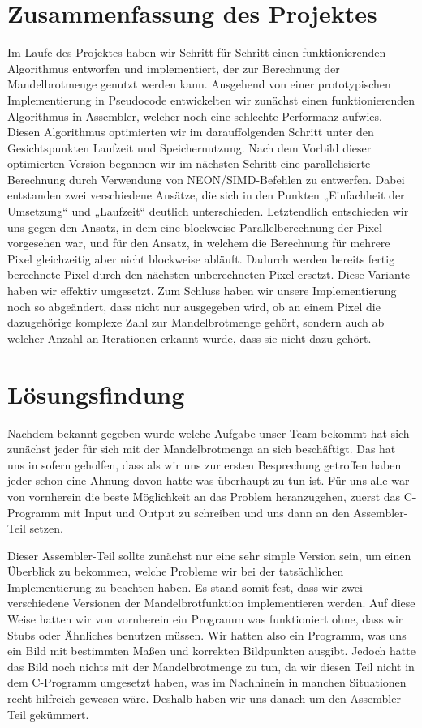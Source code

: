 \documentclass[11pt]{scrartcl}
\begin{document}
\section{Zusammenfassung des Projektes}
Im Laufe des Projektes haben wir Schritt für Schritt einen funktionierenden Algorithmus entworfen und implementiert, der zur Berechnung der Mandelbrotmenge  genutzt werden kann.
Ausgehend von einer prototypischen Implementierung in Pseudocode entwickelten wir zunächst einen funktionierenden Algorithmus in Assembler, welcher noch eine schlechte Performanz aufwies.
Diesen Algorithmus optimierten wir im darauffolgenden Schritt unter den Gesichtspunkten Laufzeit und Speichernutzung.
Nach dem Vorbild dieser optimierten Version begannen wir im nächsten Schritt eine parallelisierte Berechnung durch Verwendung von NEON/SIMD-Befehlen zu entwerfen.
Dabei entstanden zwei verschiedene Ansätze, die sich in den Punkten „Einfachheit der Umsetzung“ und „Laufzeit“ deutlich unterschieden.
Letztendlich entschieden wir uns gegen den Ansatz, in dem eine blockweise Parallelberechnung der Pixel vorgesehen war, und für den Ansatz, in welchem die Berechnung für mehrere Pixel gleichzeitig aber nicht blockweise abläuft.
Dadurch werden bereits fertig berechnete Pixel durch den nächsten unberechneten Pixel ersetzt.
Diese Variante haben wir effektiv umgesetzt.
Zum Schluss haben wir unsere Implementierung noch so abgeändert, dass nicht nur ausgegeben wird, ob an einem Pixel die dazugehörige komplexe Zahl zur Mandelbrotmenge gehört, sondern auch ab welcher Anzahl an Iterationen erkannt wurde, dass sie nicht dazu gehört.
\pagebreak
\section{Lösungsfindung}
Nachdem bekannt gegeben wurde welche Aufgabe unser Team bekommt hat sich zunächst jeder für sich mit der Mandelbrotmenga an sich beschäftigt.
Das hat uns in sofern geholfen, dass als wir uns zur ersten Besprechung getroffen haben jeder schon eine Ahnung davon hatte was überhaupt zu tun ist.
Für uns alle war von vornherein die beste Möglichkeit an das Problem heranzugehen, zuerst das C-Programm mit Input und Output zu schreiben und uns dann an den Assembler-Teil setzen.

Dieser Assembler-Teil sollte zunächst nur eine sehr simple Version sein, um einen Überblick zu bekommen, welche Probleme wir bei der tatsächlichen Implementierung zu beachten haben.
Es stand somit fest, dass wir zwei verschiedene Versionen der Mandelbrotfunktion implementieren werden.
Auf diese Weise hatten wir von vornherein ein Programm was funktioniert ohne, dass wir Stubs oder Ähnliches benutzen müssen.
Wir hatten also ein Programm, was uns ein Bild mit bestimmten Maßen und korrekten Bildpunkten ausgibt.
Jedoch hatte das Bild noch nichts mit der Mandelbrotmenge zu tun, da wir diesen Teil nicht in dem C-Programm umgesetzt haben, was im Nachhinein in manchen Situationen recht hilfreich gewesen wäre.
Deshalb haben wir uns danach um den Assembler-Teil gekümmert.
\end{document}

